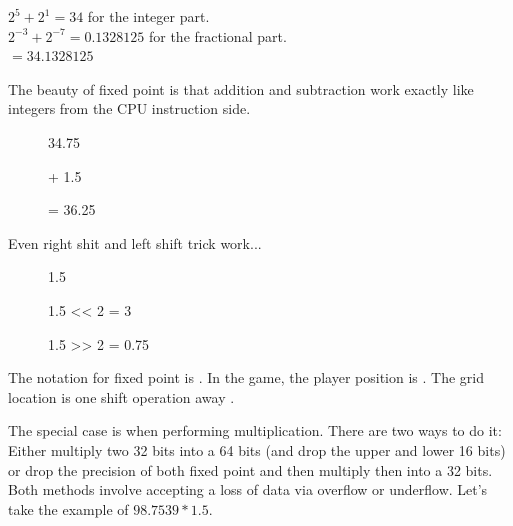 $ 2^5 + 2^1 = 34 $ for the integer part.\\
$ 2^{-3}+2^{-7} = 0.1328125 $ for the fractional part.\\
$ = 34.1328125$\\

\bigskip

The beauty of fixed point is that addition and subtraction work exactly like integers from the CPU instruction side.\\




\par
\begin{figure}[H]
 \centering
   

   \caption{34.75} 
\end{figure} 

\begin{figure}[H]
 \centering
   
  \caption{+ 1.5} 
\end{figure} 

\begin{figure}[H]
 \centering
   
  {\caption{= 36.25}}
\end{figure} 
\par
 Even right shit and left shift trick work...\\
 
 \par
\begin{figure}[H]
 \centering
   
   \caption{1.5} 
\end{figure} 

\par
\begin{figure}[H]
 \centering
   
   \caption{1.5 << 2  = 3} 
\end{figure}

\par
\begin{figure}[H]
 \centering
   
   \caption{1.5 >> 2 = 0.75} 
\end{figure}

The notation for fixed point is . In the game, the player position is . The grid location is one shift operation away .\\
\par
 The special case is when performing multiplication. There are two ways to do it: Either multiply two 32 bits into a 64 bits (and drop the upper and lower 16 bits) or drop the precision of both fixed point and then multiply then into a 32 bits. Both methods involve accepting a loss of data via overflow or underflow. Let's take the example of $98.7539 * 1.5$.



